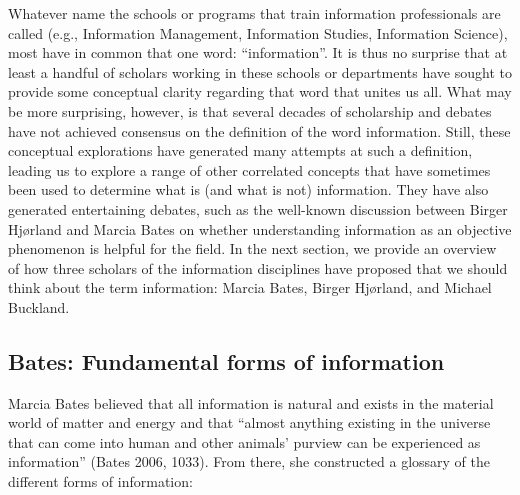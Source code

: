 \documentclass[
  letterpaper,
  DIV=11,
  numbers=noendperiod]{scrreprt}
\begin{document}
Whatever name the schools or programs that train information
professionals are called (e.g., Information Management, Information
Studies, Information Science), most have in common that one word:
``information''. It is thus no surprise that at least a handful of
scholars working in these schools or departments have sought to provide
some conceptual clarity regarding that word that unites us all. What may
be more surprising, however, is that several decades of scholarship and
debates have not achieved consensus on the definition of the word
information. Still, these conceptual explorations have generated many
attempts at such a definition, leading us to explore a range of other
correlated concepts that have sometimes been used to determine what is
(and what is not) information. They have also generated entertaining
debates, such as the well-known discussion between Birger Hjørland and
Marcia Bates on whether understanding information as an objective
phenomenon is helpful for the field. In the next section, we provide an
overview of how three scholars of the information disciplines have
proposed that we should think about the term information: Marcia Bates,
Birger Hjørland, and Michael Buckland.

\subsection{Bates: Fundamental forms of
information}\label{bates-fundamental-forms-of-information}

Marcia Bates believed that all information is natural and exists in the
material world of matter and energy and that ``almost anything existing
in the universe that can come into human and other animals' purview can
be experienced as information'' (Bates 2006, 1033). From there, she
constructed a glossary of the different forms of information:
\end{document}
